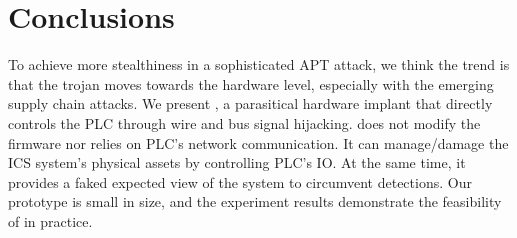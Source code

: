 \section{Conclusions}
\label{sec:implant-conclusions}

To achieve more stealthiness in a sophisticated APT attack, we think the trend is that the trojan moves towards the hardware level, especially with the emerging supply chain attacks. We present \name, a parasitical hardware implant that directly controls the PLC through wire and bus signal hijacking. \name does not modify the firmware nor relies on PLC's network communication. It can manage/damage the ICS system's physical assets by controlling PLC's IO.  At the same time, it provides a faked expected view of the system to circumvent detections. Our prototype is small in size, and the experiment results demonstrate the feasibility of \name in practice.
